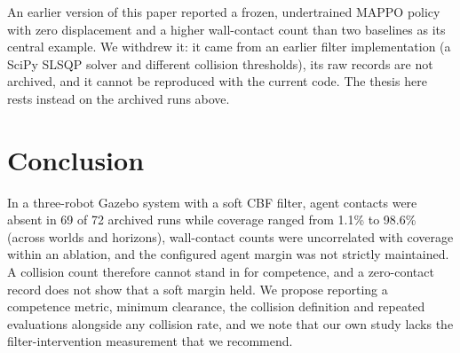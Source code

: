 \documentclass[12pt]{article}
\begin{document}
An earlier version of this paper reported a frozen, undertrained MAPPO
policy with zero displacement and a higher wall-contact count than two
baselines as its central example. We withdrew it: it came from an earlier
filter implementation (a SciPy SLSQP solver and different collision
thresholds), its raw records are not archived, and it cannot be reproduced
with the current code. The thesis here rests instead on the archived runs
above.

\section{Conclusion}
In a three-robot Gazebo system with a soft CBF filter, agent contacts were
absent in 69 of 72 archived runs while coverage ranged from 1.1\% to
98.6\% (across worlds and horizons), wall-contact counts were uncorrelated with coverage within an
ablation, and the configured agent margin was not strictly maintained. A
collision count therefore cannot stand in for competence, and a zero-contact
record does not show that a soft margin held. We propose reporting a
competence metric, minimum clearance, the collision definition and repeated
evaluations alongside any collision rate, and we note that our own study
lacks the filter-intervention measurement that we recommend.



\end{document}
